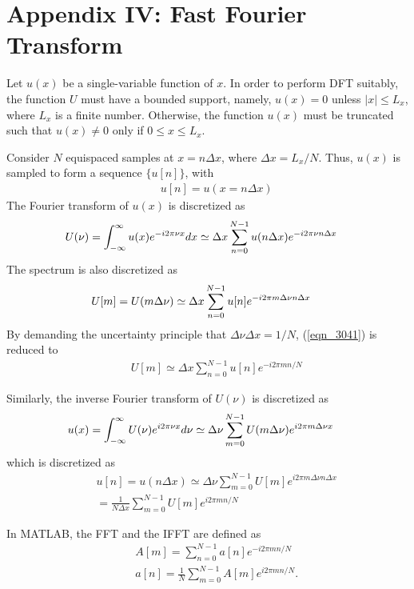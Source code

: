 \section*{Appendix IV: Fast Fourier Transform}

Let $u(x)$ be a single-variable function of $x$.
In order to perform DFT suitably, the function $U$ must have a bounded support, namely,
$u(x) = 0$ unless $|x| \leq L_x$, where $L_x$ is a finite number.
Otherwise, the function $u(x)$ must be truncated such that $u(x) \neq 0$ only if $0 \leq x \leq L_x$. 

Consider $N$ equispaced samples at $x = n \Delta x$, where $\Delta x = L_x / N$.
Thus, $u (x)$ is sampled to form a sequence $\{ u[n] \}$, with
\begin{eqnarray}
&&u [n] = u (x = n \Delta x)
\nonumber
\end{eqnarray}
The Fourier transform of $u(x)$ is discretized as
\begin{eqnarray}
&&\hspace{-0.3in} U (\nu) = \int_{-\infty}^{\infty} u (x) e^{- i 2 \pi \nu x} dx
\simeq \Delta x \sum_{n = 0}^{N - 1} u (n \Delta x) e^{- i 2 \pi \nu n \Delta x}
\nonumber
\end{eqnarray}
The spectrum is also discretized as
\begin{eqnarray}
&&\hspace{-0.3in} U[m] = U (m \Delta \nu)  \simeq \Delta x \sum_{n = 0}^{N - 1} u [n] e^{- i 2 \pi m \Delta \nu n \Delta x}
\label{eqn_3041}
\end{eqnarray}
By demanding the uncertainty principle that $\Delta \nu \Delta x =  1/N$,
(\ref{eqn_3041}) is reduced to
\begin{eqnarray}
&&U[m] \simeq \Delta x \sum_{n = 0}^{N - 1} u [n] e^{- i 2 \pi m n / N}
\label{eqn_3042}
\end{eqnarray}

Similarly, the inverse Fourier transform of $U (\nu)$ is discretized as
\begin{eqnarray}
&&\hspace{-0.3in} u(x) = \int_{-\infty}^{\infty} U (\nu) e^{i 2 \pi \nu x} d \nu
\simeq \Delta \nu \sum_{m = 0}^{N - 1} U (m \Delta \nu) e^{i 2 \pi m \Delta \nu x}
\nonumber
\end{eqnarray}
which is discretized as
\begin{eqnarray}
&&u[n] = u(n \Delta x) 
\simeq \Delta \nu \sum_{m = 0}^{N - 1} U [m] e^{i 2 \pi m \Delta \nu n \Delta x} 
\nonumber \\
&&= \frac{1}{N \Delta x} \sum_{m = 0}^{N - 1} U [m] e^{i 2 \pi m n /N} 
\label{eqn_3043}
\end{eqnarray}

In MATLAB, the FFT and the IFFT are defined as
\begin{eqnarray}
&&A[m] = \sum_{n = 0}^{N - 1} a[n] e^{-i 2\pi m n/ N}
\nonumber \\
&&a[n] = \frac{1}{N} \sum_{m = 0}^{N - 1} A[m] e^{i 2 \pi mn/N}.
\label{eq:DFT_pairs}
\end{eqnarray}
